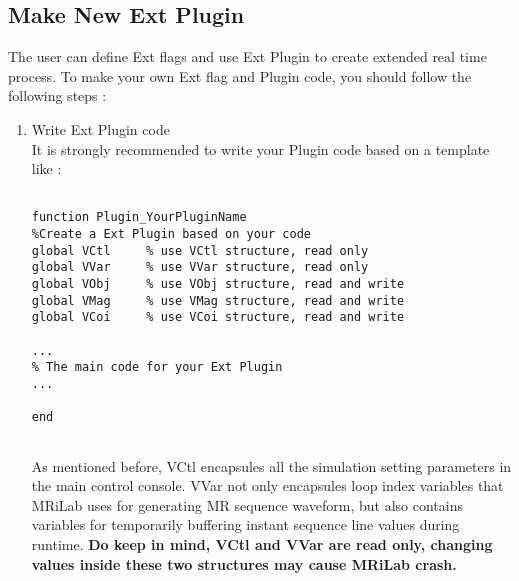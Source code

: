 \documentclass{book}%
\begin{document}
\subsection{Make New Ext Plugin}

The user can define Ext flags and use Ext Plugin to create extended real time process. To make your own Ext flag and Plugin code, you should follow the following steps :

\begin{enumerate}

\item Write Ext Plugin code \\

It is strongly recommended to write your Plugin code based on a template like :

\begin{verbatim}

function Plugin_YourPluginName
%Create a Ext Plugin based on your code
global VCtl     % use VCtl structure, read only
global VVar     % use VVar structure, read only
global VObj     % use VObj structure, read and write
global VMag     % use VMag structure, read and write
global VCoi     % use VCoi structure, read and write

...
% The main code for your Ext Plugin
...

end


\end{verbatim}

As mentioned before, VCtl encapsules all the simulation setting parameters in the main control console. VVar not only encapsules loop index variables that MRiLab uses for generating MR sequence waveform, but also contains variables for temporarily buffering instant sequence line values during runtime. \textbf{Do keep in mind, VCtl and VVar are read only, changing values inside these two structures may cause MRiLab crash.}


\end{enumerate}
\end{document}
